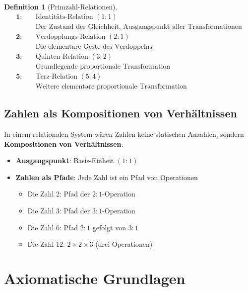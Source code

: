 \documentclass[11pt,a4paper]{article}
\newcommand{\primrel}[1]{\mathbf{#1}}
\newtheorem{definition}{Definition}[section]
\begin{document}
	\begin{definition}[Primzahl-Relationen]
		\begin{align}
			\primrel{1}: \quad &\text{Identitäts-Relation } (1:1) \\
			&\text{Der Zustand der Gleichheit, Ausgangspunkt aller Transformationen} \\[0.5em]
			\primrel{2}: \quad &\text{Verdopplungs-Relation } (2:1) \\
			&\text{Die elementare Geste des Verdoppelns} \\[0.5em]
			\primrel{3}: \quad &\text{Quinten-Relation } (3:2) \\
			&\text{Grundlegende proportionale Transformation} \\[0.5em]
			\primrel{5}: \quad &\text{Terz-Relation } (5:4) \\
			&\text{Weitere elementare proportionale Transformation}
		\end{align}
	\end{definition}
	
	\subsection{Zahlen als Kompositionen von Verhältnissen}
	
	In einem relationalen System wären Zahlen keine statischen Anzahlen, sondern \textbf{Kompositionen von Verhältnissen}:
	
	\begin{itemize}
		\item \textbf{Ausgangspunkt}: Basis-Einheit $(1:1)$
		\item \textbf{Zahlen als Pfade}: Jede Zahl ist ein Pfad von Operationen
		\begin{itemize}
			\item Die Zahl 2: Pfad der $2:1$-Operation
			\item Die Zahl 3: Pfad der $3:1$-Operation  
			\item Die Zahl 6: Pfad $2:1$ gefolgt von $3:1$
			\item Die Zahl 12: $2 \times 2 \times 3$ (drei Operationen)
		\end{itemize}
	\end{itemize}
	
	\section{Axiomatische Grundlagen}
	
\end{document}
